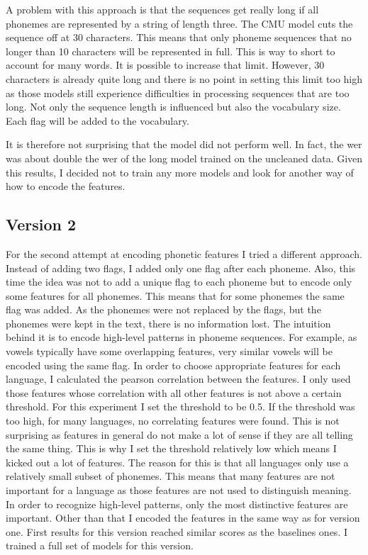 A problem with this approach is that the sequences get really long if all phonemes are represented by a string of length three. The CMU model cuts the sequence off at 30 characters. This means that only phoneme sequences that no longer than 10 characters will be represented in full. This is way to short to account for many words. It is possible to increase that limit. However, 30 characters is already quite long and there is no point in setting this limit too high as those models still experience difficulties in processing sequences that are too long. Not only the sequence length is influenced but also the vocabulary size. Each flag will be added to the vocabulary.  

It is therefore not surprising that the model did not perform well. In fact, the \ac{wer} was about double the \ac{wer} of the long model trained on the uncleaned data. Given this results, I decided not to train any more models and look for another way of how to encode the features.

\subsection*{Version 2}
For the second attempt at encoding phonetic features I tried a different approach. Instead of adding two flags, I added only one flag after each phoneme. Also, this time the idea was not to add a unique flag to each phoneme but to encode only some features for all phonemes. This means that for some phonemes the same flag was added. As the phonemes were not replaced by the flags, but the phonemes were kept in the text, there is no information lost. The intuition behind it is to encode high-level patterns in phoneme sequences. For example, as vowels typically have some overlapping features, very similar vowels will be encoded using the same flag. In order to choose appropriate features for each language, I calculated the pearson correlation between the features. I only used those features whose correlation with all other features is not above a certain threshold. For this experiment I set the threshold to be 0.5. If the threshold was too high, for many languages, no correlating features were found. This is not surprising as features in general do not make a lot of sense if they are all telling the same thing. This is why I set the threshold relatively low which means I kicked out a lot of features. 
The reason for this is that all languages only use a relatively small subset of phonemes. This means that many features are not important for a language as those features are not used to distinguish meaning. In order to recognize high-level patterns, only the most distinctive features are important. Other than that I encoded the features in the same way as for version one. First results for this version reached similar scores as the baselines ones. I trained a full set of models for this version.

